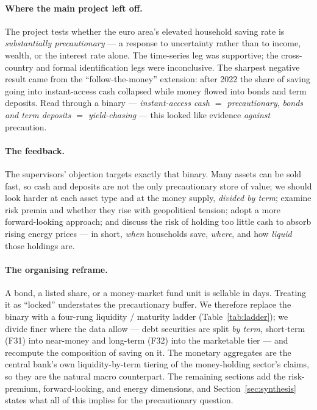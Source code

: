 \documentclass[11pt,a4paper]{article}
\begin{document}
\paragraph{Where the main project left off.} The project tests whether the euro
area's elevated household saving rate is \emph{substantially precautionary} ---
a response to uncertainty rather than to income, wealth, or the interest rate
alone. The time-series leg was supportive; the cross-country and formal
identification legs were inconclusive. The sharpest negative result came from
the ``follow-the-money'' extension: after 2022 the share of saving going into
instant-access cash collapsed while money flowed into bonds and term deposits.
Read through a binary --- \emph{instant-access cash $=$ precautionary},
\emph{bonds and term deposits $=$ yield-chasing} --- this looked like evidence
\emph{against} precaution.

\paragraph{The feedback.} The supervisors' objection targets exactly that
binary. Many assets can be sold fast, so cash and deposits are not the only
precautionary store of value; we should look harder at each asset type and at
the money supply, \emph{divided by term}; examine risk premia and whether they
rise with geopolitical tension; adopt a more forward-looking approach; and
discuss the risk of holding too little cash to absorb rising energy prices ---
in short, \emph{when} households save, \emph{where}, and how \emph{liquid} those
holdings are.

\paragraph{The organising reframe.} A bond, a listed share, or a money-market
fund unit is sellable in days. Treating it as ``locked'' understates the
precautionary buffer. We therefore replace the binary with a four-rung
liquidity / maturity ladder (Table~\ref{tab:ladder}); we divide finer where the
data allow --- debt securities are split \emph{by term}, short-term (F31) into
near-money and long-term (F32) into the marketable tier --- and recompute the
composition of saving on it. The monetary aggregates are the central bank's own
liquidity-by-term tiering of the money-holding sector's claims, so they are the
natural macro counterpart. The remaining sections add the risk-premium,
forward-looking, and energy dimensions, and Section~\ref{sec:synthesis} states
what all of this implies for the precautionary question.
\end{document}
